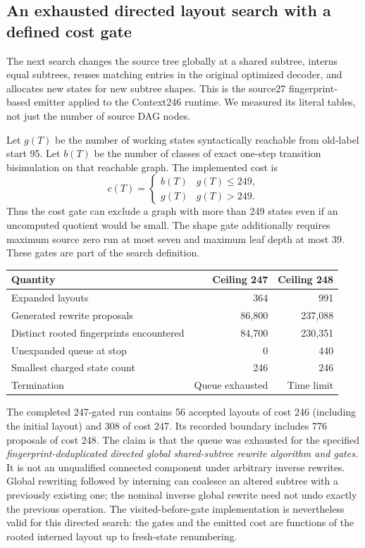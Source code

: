 \subsection{An exhausted directed layout search with a defined cost gate}

The next search changes the source tree globally at a shared subtree,
interns equal subtrees, reuses matching entries in the original optimized
decoder, and allocates new states for new subtree shapes. This is the
source27 fingerprint-based emitter applied to the Context246 runtime.
We measured its literal tables, not just the number of source DAG nodes.

Let $g(T)$ be the number of working states syntactically reachable from
old-label start 95. Let $b(T)$ be the number of classes of exact one-step
transition bisimulation on that reachable graph. The implemented cost is
\[
 c(T)=\begin{cases}b(T)&g(T)\leq249,\\g(T)&g(T)>249.\end{cases}
\]
Thus the cost gate can exclude a graph with more than 249 states even
if an uncomputed quotient would be small. The shape gate additionally
requires maximum source zero run at most seven and maximum leaf depth
at most 39. These gates are part of the search definition.

\begin{center}
\begin{tabular}{lrr}
\toprule
Quantity & Ceiling 247 & Ceiling 248\\
\midrule
Expanded layouts &364&991\\
Generated rewrite proposals &86,800&237,088\\
Distinct rooted fingerprints encountered &84,700&230,351\\
Unexpanded queue at stop &0&440\\
Smallest charged state count &246&246\\
Termination &Queue exhausted&Time limit\\
\bottomrule
\end{tabular}
\end{center}

The completed 247-gated run contains 56 accepted layouts of cost 246
(including the initial layout) and 308 of cost 247. Its recorded boundary
includes 776 proposals of cost 248. The claim is that the queue was
exhausted for the specified \emph{fingerprint-deduplicated directed global
shared-subtree rewrite algorithm and gates}. It is not an unqualified connected
component under arbitrary inverse rewrites. Global rewriting followed by
interning can coalesce an altered subtree with a previously existing one;
the nominal inverse global rewrite need not undo exactly the previous
operation. The visited-before-gate implementation is nevertheless valid
for this directed search: the gates and the emitted cost are functions
of the rooted interned layout up to fresh-state renumbering.

